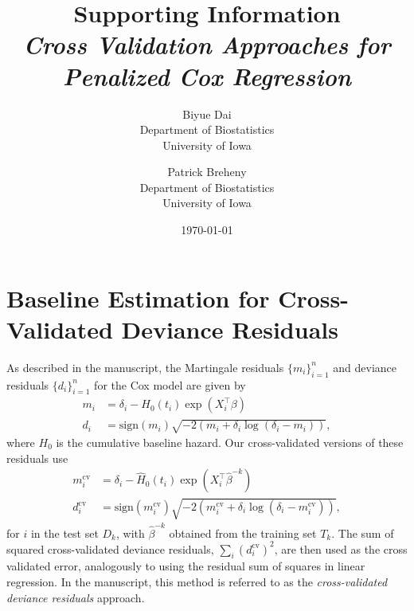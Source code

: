 \documentclass{article}
\title{Supporting Information\\
\textit{Cross Validation Approaches for Penalized Cox Regression}}
\author{Biyue Dai\\Department of Biostatistics\\University of Iowa
  \and
  Patrick Breheny\\Department of Biostatistics\\University of Iowa}
\date{\today}
\providecommand{\Tr}{^{\scriptscriptstyle\top}}
\begin{document}
\maketitle

\section{Baseline Estimation for Cross-Validated Deviance Residuals}

As described in the manuscript, the Martingale residuals $\{m_i\}_{i=1}^n$ and deviance residuals $\{d_i\}_{i=1}^n$ for the Cox model are given by
\begin{align*}
  m_{i} &= \delta_{i} - H_{0}(t_{i})\exp(X_i\Tr\beta) \\
  d_{i} &= \text{sign}(m_{i})\sqrt{-2(m_i + \delta_{i}\log(\delta_{i} - m_i))},
\end{align*}
where $H_0$ is the cumulative baseline hazard.  Our cross-validated versions of these residuals use
\begin{align*}
  m_{i}^{\text{cv}} &= \delta_{i} - \hat{H}_{0}(t_{i})\exp(X_i\Tr\hat\beta^{-k}) \\
  d_{i}^{\text{cv}} &= \text{sign}(m_{i}^{\text{cv}})\sqrt{-2(m_i^{\text{cv}} + \delta_{i}\log(\delta_{i} - m_i^{\text{cv}}))},
\end{align*}
for $i$ in the test set $D_k$, with $\hat{\beta}^{-k}$ obtained from the training set $T_k$.  The sum of squared cross-validated deviance residuals, $\sum_{i}(d_{i}^{\text{cv}})^2$, are then used as the cross validated error, analogously to using the residual sum of squares in linear regression.  In the manuscript, this method is referred to as the \emph{cross-validated deviance residuals} approach.

\end{document}

